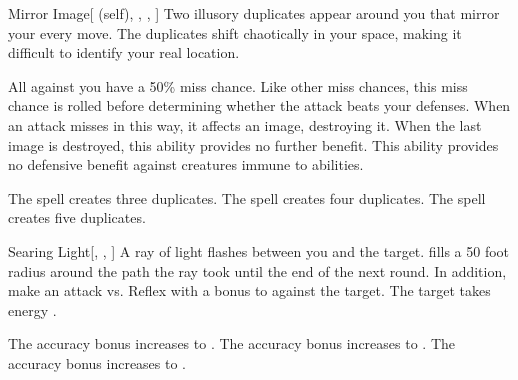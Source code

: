 \lowercase{\hypertarget{spell:Mirror Image}{}}\label{spell:Mirror Image}
\begin{attuneability}[Rank 1]{\hypertarget{spell:Mirror Image}{Mirror Image}}[ (self), , , ]
Two illusory duplicates appear around you that mirror your every move.
The duplicates shift chaotically in your space, making it difficult to identify your real location.

All  against you have a 50\% miss chance.
Like other miss chances, this miss chance is rolled before determining whether the attack beats your defenses.
When an attack misses in this way, it affects an image, destroying it.
When the last image is destroyed, this ability provides no further benefit.
This ability provides no defensive benefit against creatures immune to  abilities.

\rankline
{} The spell creates three duplicates.
 The spell creates four duplicates.
 The spell creates five duplicates.
\end{attuneability}
\vspace{0.25em}



\lowercase{\hypertarget{spell:Searing Light}{}}\label{spell:Searing Light}
\begin{freeability}[Rank 1]{\hypertarget{spell:Searing Light}{Searing Light}}[, , ]
A ray of light flashes between you and the target.
 fills a 50 foot radius around the path the ray took until the end of the next round.
In addition, make an attack vs. Reflex with a  bonus to  against the target.
\hit The target takes energy .

\rankline
{} The accuracy bonus increases to .
 The accuracy bonus increases to .
 The accuracy bonus increases to .
\end{freeability}
\vspace{0.25em}



